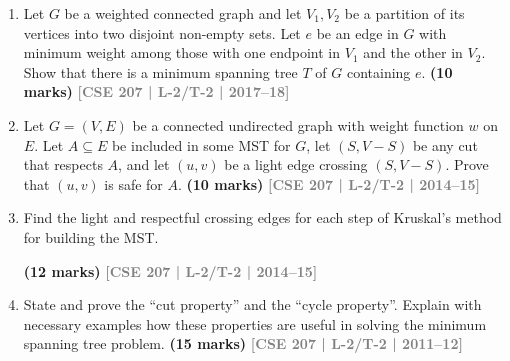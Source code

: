 \documentclass[12pt]{article}
\newcommand{\yr}[1]{\hfill\textcolor{gray}{\small\textbf{[#1]}}}
\newcommand{\mk}[1]{\textcolor{orange!70!black}{\small\textbf{(#1 marks)}}}
\begin{document}
\begin{enumerate}

  \item Let $G$ be a weighted connected graph and let $V_1, V_2$ be a partition of its vertices into two disjoint non-empty sets. Let $e$ be an edge in $G$ with minimum weight among those with one endpoint in $V_1$ and the other in $V_2$. Show that there is a minimum spanning tree $T$ of $G$ containing $e$. \mk{10}
    \yr{CSE 207 | L-2/T-2 | 2017--18}


  \item Let $G = (V, E)$ be a connected undirected graph with weight function $w$ on $E$. Let $A \subseteq E$ be included in some MST for $G$, let $(S, V-S)$ be any cut that respects $A$, and let $(u, v)$ be a light edge crossing $(S, V-S)$. Prove that $(u, v)$ is safe for $A$. \mk{10}
    \yr{CSE 207 | L-2/T-2 | 2014--15}


  \item Find the light and respectful crossing edges for each step of Kruskal's method for building the MST.

    \begin{center}

    \end{center}

    \mk{12} \yr{CSE 207 | L-2/T-2 | 2014--15}


  \item State and prove the ``cut property'' and the ``cycle property''. Explain with necessary examples how these properties are useful in solving the minimum spanning tree problem. \mk{15}
    \yr{CSE 207 | L-2/T-2 | 2011--12}


\end{enumerate}
\end{document}
